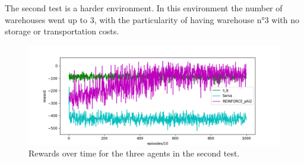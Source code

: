 \documentclass[journal, a4paper]{IEEEtran}
\theoremstyle{plain}
\theoremstyle{definition}
\begin{document}
The second test is a harder environment. 
In this environment the number of warehouses went up to 3, with the particularity of having warehouse n°3 with no storage or transportation costs.
\begin{figure}[h]
	\centering
	\includegraphics[width=\columnwidth]{weird_2_env_rewards.png}
	\caption{\label{weird_2_env_rewards} Rewards over time for the three agents in the second test.}
\end{figure}
\end{document}
